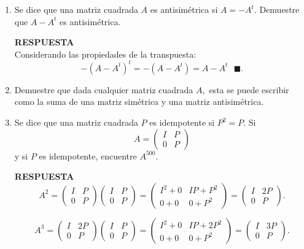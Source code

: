 \documentclass[11pt,letterpaper]{article}
\newcommand{\res}{\textbf{RESPUESTA}\\}
\newcommand{\finf}{\blacksquare.}
\begin{document}
\begin{enumerate}
\res
Multiplicado por $A^{p-1}$ por la izquierda y $B^{q-1}$ por la derecha tenemos que:

$$A^{p-1}(AB)B^{q-1}=A^{p-1}(BA)B^{q-1} \ \ \ \ \finf$$


\item Se dice que una matriz cuadrada $A$ es antisimétrica si $A=-A^t.$ Demuestre que $A-A^t$ es antisimétrica.

\res
Considerando las propiedades de la transpuesta:
$$-(A-A^t)^t=-(A-A^t)=A-A^t\ \ \ \finf$$

\item Demuestre que dada cualquier matriz cuadrada $A,$ esta se puede escribir como la suma de una matriz simétrica y una matriz antisimétrica.

\item Se dice que una matriz cuadrada $P$ es idempotente si $P^2=P$. Si 
\begin{equation*}
A=\left(\begin{array}{cc}
I& P\\
0&P
\end{array}
\right)
\end{equation*}
y si $P$ es idempotente, encuentre $A^{500}.$

\res
\begin{equation*}
A^2=\left(\begin{array}{cc}
I& P\\
0&P
\end{array}
\right)\left(\begin{array}{cc}
I& P\\
0&P
\end{array}
\right)=
\left(\begin{array}{cc}
I^2+0& IP+P^2\\
0+0&0+P^2
\end{array}
\right)=\left(\begin{array}{cc}
I&2P\\
0&P
\end{array}
\right).
\end{equation*}

\begin{equation*}
A^3=\left(\begin{array}{cc}
I& 2P\\
0&P
\end{array}
\right)\left(\begin{array}{cc}
I& P\\
0&P
\end{array}
\right)=
\left(\begin{array}{cc}
I^2+0& IP+2P^2\\
0+0&0+P^2
\end{array}
\right)=\left(\begin{array}{cc}
I&3P\\
0&P
\end{array}
\right).
\end{equation*}



\end{enumerate}
\end{document}
